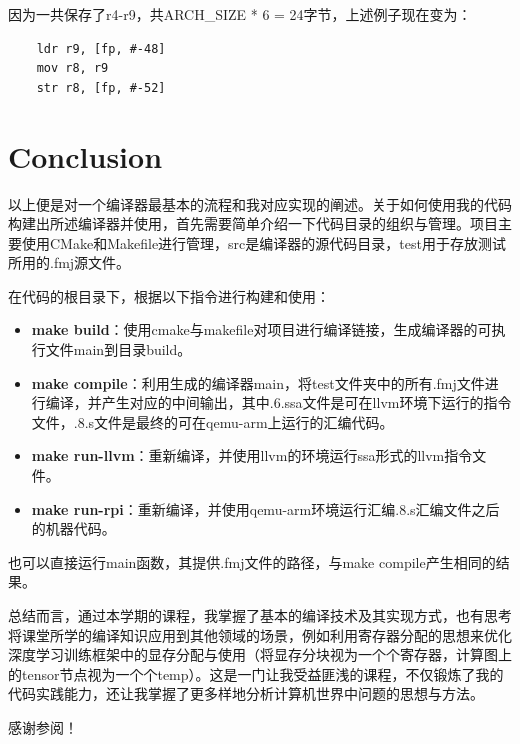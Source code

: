 \documentclass{article}
\begin{document}
因为一共保存了r4-r9，共ARCH\_SIZE * 6 = 24字节，上述例子现在变为：

    \begin{lstlisting}
    ldr r9, [fp, #-48]
    mov r8, r9
    str r8, [fp, #-52]
    \end{lstlisting}

\section{Conclusion}
以上便是对一个编译器最基本的流程和我对应实现的阐述。关于如何使用我的代码构建出所述编译器并使用，首先需要简单介绍一下代码目录的组织与管理。项目主要使用CMake和Makefile进行管理，src是编译器的源代码目录，test用于存放测试所用的.fmj源文件。

在代码的根目录下，根据以下指令进行构建和使用：
\begin{itemize}
    \item \textbf{make build}：使用cmake与makefile对项目进行编译链接，生成编译器的可执行文件main到目录build。

    \item \textbf{make compile}：利用生成的编译器main，将test文件夹中的所有.fmj文件进行编译，并产生对应的中间输出，其中.6.ssa文件是可在llvm环境下运行的指令文件，.8.s文件是最终的可在qemu-arm上运行的汇编代码。
    
    \item \textbf{make run-llvm}：重新编译，并使用llvm的环境运行ssa形式的llvm指令文件。

    \item \textbf{make run-rpi}：重新编译，并使用qemu-arm环境运行汇编.8.s汇编文件之后的机器代码。
\end{itemize}
也可以直接运行main函数，其提供.fmj文件的路径，与make compile产生相同的结果。

总结而言，通过本学期的课程，我掌握了基本的编译技术及其实现方式，也有思考将课堂所学的编译知识应用到其他领域的场景，例如利用寄存器分配的思想来优化深度学习训练框架中的显存分配与使用（将显存分块视为一个个寄存器，计算图上的tensor节点视为一个个temp）。这是一门让我受益匪浅的课程，不仅锻炼了我的代码实践能力，还让我掌握了更多样地分析计算机世界中问题的思想与方法。

感谢参阅！
\end{document}
